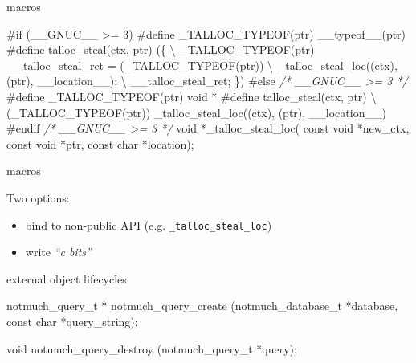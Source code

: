 \documentclass[ignorenonframetext,aspectratio=169]{beamer}
\newenvironment{Shaded}{}{}
\newcommand{\DataTypeTok}[1]{\textcolor[rgb]{0.56,0.13,0.00}{{#1}}}
\newcommand{\CommentTok}[1]{\textcolor[rgb]{0.38,0.63,0.69}{\textit{{#1}}}}
\newcommand{\PreprocessorTok}[1]{\textcolor[rgb]{0.74,0.48,0.00}{{#1}}}
\newcommand{\NormalTok}[1]{{#1}}
\providecommand{\tightlist}{%
  \setlength{\itemsep}{0pt}\setlength{\parskip}{0pt}}
\begin{document}
\begin{frame}[fragile]{macros}

\begin{Shaded}
\begin{Highlighting}[]
\PreprocessorTok{#if (__GNUC__ >= 3)}
\PreprocessorTok{#define _TALLOC_TYPEOF(ptr) __typeof__(ptr)}
\PreprocessorTok{#define talloc_steal(ctx, ptr) (\{ \textbackslash{}}
\PreprocessorTok{  _TALLOC_TYPEOF(ptr) __talloc_steal_ret = (_TALLOC_TYPEOF(ptr)) \textbackslash{}}
\PreprocessorTok{    _talloc_steal_loc((ctx), (ptr), __location__); \textbackslash{}}
\PreprocessorTok{  __talloc_steal_ret; \})}
\PreprocessorTok{#else }\CommentTok{/* __GNUC__ >= 3 */}
\PreprocessorTok{#define _TALLOC_TYPEOF(ptr) void *}
\PreprocessorTok{#define talloc_steal(ctx, ptr) \textbackslash{}}
\PreprocessorTok{  (_TALLOC_TYPEOF(ptr)) _talloc_steal_loc((ctx), (ptr), __location__)}
\PreprocessorTok{#endif }\CommentTok{/* __GNUC__ >= 3 */}
\DataTypeTok{void} \NormalTok{*_talloc_steal_loc(}
  \DataTypeTok{const} \DataTypeTok{void} \NormalTok{*new_ctx, }\DataTypeTok{const} \DataTypeTok{void} \NormalTok{*ptr, }\DataTypeTok{const} \DataTypeTok{char} \NormalTok{*location);}
\end{Highlighting}
\end{Shaded}

\end{frame}

\begin{frame}[fragile]{macros}

Two options:

\begin{itemize}
\tightlist
\item
  bind to non-public API (e.g. \texttt{\_talloc\_steal\_loc})
\item
  write \emph{``c bits''}
\end{itemize}

\end{frame}

\begin{frame}[fragile]{external object lifecycles}

\begin{Shaded}
\begin{Highlighting}[]
\NormalTok{notmuch_query_t *}
\NormalTok{notmuch_query_create (notmuch_database_t *database,}
                      \DataTypeTok{const} \DataTypeTok{char} \NormalTok{*query_string);}

\DataTypeTok{void}
\NormalTok{notmuch_query_destroy (notmuch_query_t *query);}
\end{Highlighting}
\end{Shaded}

\end{frame}
\end{document}
